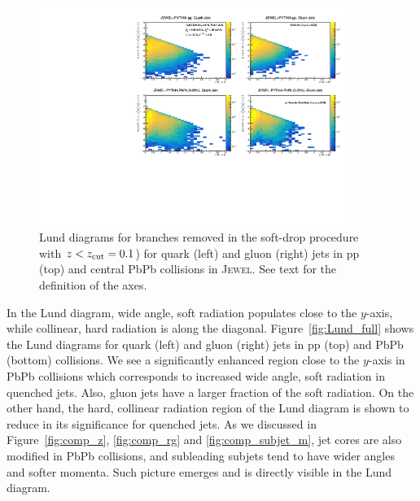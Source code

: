 \documentclass[notoc]{JHEP3}
\begin{document}
\begin{figure}[t]
	\centering
	\includegraphics[width=0.9\textwidth]{plots/Individual_LundDiagrams_zrel_background.pdf}
	\caption{Lund diagrams for branches removed in the soft-drop procedure with $z<z_{\rm cut}=0.1$) for quark (left) and gluon (right) jets in pp (top) and central PbPb collisions in \textsc{Jewel}. See text for the definition of the axes.}
\label{fig:Lund_bkg}
\end{figure}

In the Lund diagram, wide angle, soft radiation populates close to the $y$-axis, while collinear, hard radiation is along the diagonal. Figure~\ref{fig:Lund_full} shows the Lund diagrams for quark (left) and gluon (right) jets in pp (top) and PbPb (bottom) collisions. We see a significantly enhanced region close to the $y$-axis in PbPb collisions which corresponds to increased wide angle, soft radiation in quenched jets. Also, gluon jets have a larger fraction of the soft radiation. On the other hand, the hard, collinear radiation region of the Lund diagram is shown to reduce in its significance for quenched jets. As we discussed in Figure~\ref{fig:comp_z}, \ref{fig:comp_rg} and \ref{fig:comp_subjet_m}, jet cores are also modified in PbPb collisions, and subleading subjets tend to have wider angles and softer momenta. Such picture emerges and is directly visible in the Lund diagram.
\end{document}

